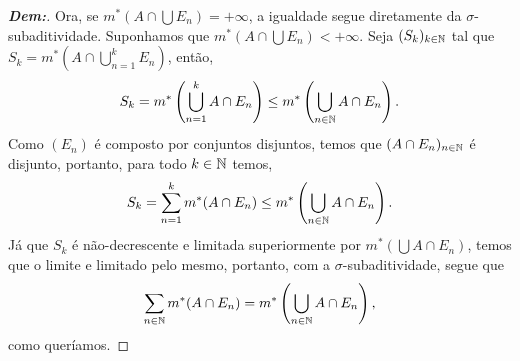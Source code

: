 \begin{proof}[\textbf{Dem:}]
  Ora, se $m^*(A \cap \bigcup E_n) = +\infty$, a igualdade segue diretamente da $\sigma$-subaditividade. Suponhamos 
  que $m^*(A \cap \bigcup E_n) < +\infty$. Seja $(S_k)_{k \in \mathbb N}$ tal que $S_k = m^*(A\cap \bigcup_{n=1}^k E_n)$,
  então,
  \begin{align*}
    S_k = m^*\left(\bigcup_{n=1}^k A \cap E_n\right) \le m^*\left(\bigcup_{n \in \mathbb N} A\cap E_n\right).
  \end{align*}
  Como $(E_n)$ é composto por conjuntos disjuntos, 
  temos que $(A \cap E_n)_{n \in \mathbb N}$ é disjunto, portanto, para todo $k \in \mathbb N$ temos,
  \begin{align*}
    S_k = \sum_{n = 1}^k m^*(A \cap E_n) \le m^*\left(\bigcup_{n \in \mathbb N} A\cap E_n\right).
  \end{align*}
  Já que $S_k$ é não-decrescente e limitada superiormente por $m^*(\bigcup A\cap E_n)$, temos que 
  o limite e limitado pelo mesmo, portanto, com a $\sigma$-subaditividade, segue que
  \begin{align*}
    \sum_{n \in \mathbb N} m^*(A\cap E_n) =  m^*\left(\bigcup_{n \in \mathbb N} A\cap E_n\right),
  \end{align*}
  como queríamos.
\end{proof}
\biglinend
\newpage
{}
\myexe{\thedois}
\bigline 
